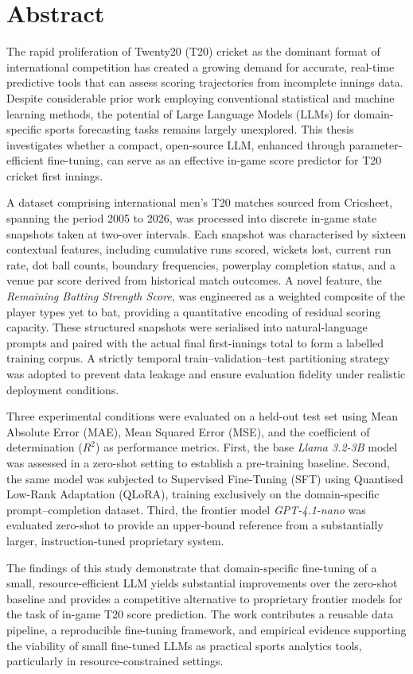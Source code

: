\chapter*{Abstract}



The rapid proliferation of Twenty20 (T20) cricket as the dominant format of international competition has created a growing demand for accurate, real-time predictive tools that can assess scoring trajectories from incomplete innings data. Despite considerable prior work employing conventional statistical and machine learning methods, the potential of Large Language Models (LLMs) for domain-specific sports forecasting tasks remains largely unexplored. This thesis investigates whether a compact, open-source LLM, enhanced through parameter-efficient fine-tuning, can serve as an effective in-game score predictor for T20 cricket first innings.

A dataset comprising international men's T20 matches sourced from Cricsheet, spanning the period 2005 to 2026, was processed into discrete in-game state snapshots taken at two-over intervals. Each snapshot was characterised by sixteen contextual features, including cumulative runs scored, wickets lost, current run rate, dot ball counts, boundary frequencies, powerplay completion status, and a venue par score derived from historical match outcomes. A novel feature, the \textit{Remaining Batting Strength Score}, was engineered as a weighted composite of the player types yet to bat, providing a quantitative encoding of residual scoring capacity. These structured snapshots were serialised into natural-language prompts and paired with the actual final first-innings total to form a labelled training corpus. A strictly temporal train--validation--test partitioning strategy was adopted to prevent data leakage and ensure evaluation fidelity under realistic deployment conditions.

Three experimental conditions were evaluated on a held-out test set using Mean Absolute Error (MAE), Mean Squared Error (MSE), and the coefficient of determination ($R^2$) as performance metrics. First, the base \textit{Llama 3.2-3B} model was assessed in a zero-shot setting to establish a pre-training baseline. Second, the same model was subjected to Supervised Fine-Tuning (SFT) using Quantised Low-Rank Adaptation (QLoRA), training exclusively on the domain-specific prompt--completion dataset. Third, the frontier model \textit{GPT-4.1-nano} was evaluated zero-shot to provide an upper-bound reference from a substantially larger, instruction-tuned proprietary system.

The findings of this study demonstrate that domain-specific fine-tuning of a small, resource-efficient LLM yields substantial improvements over the zero-shot baseline and provides a competitive alternative to proprietary frontier models for the task of in-game T20 score prediction. The work contributes a reusable data pipeline, a reproducible fine-tuning framework, and empirical evidence supporting the viability of small fine-tuned LLMs as practical sports analytics tools, particularly in resource-constrained settings.

